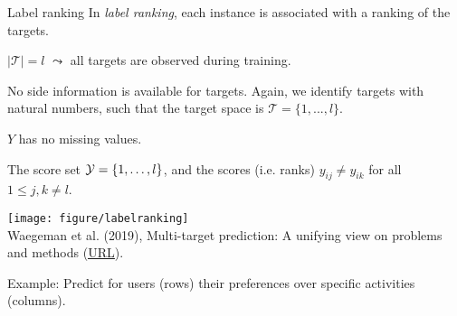\documentclass[11pt,compress,t,notes=noshow, xcolor=table]{beamer}
\newcommand{\Tspace}{\mathcal{T}}
\begin{document}
\begin{frame}{Label ranking}
	\small
    In \emph{label ranking}, each instance is associated with a ranking of the targets. 

		\begin{enumerate}\small
			
			\begin{minipage}{0.45\textwidth}    
                \item $|\Tspace| = l$ $\leadsto$ all targets are observed during training. 
                \vspace{10pt}

    			\item No side information is available for targets. Again, we identify targets with natural numbers, such that the target space is $\Tspace = \{1,...,l\}$. 		
                \vspace{10pt}
                
    			\item $Y$ has no missing values. 
                \vspace{10pt}
                
    			\item The score set $\mathcal{Y} = \{1, \ldots , l\}$, and the scores (i.e. ranks) $y_{ij} \neq y_{ik}$ for all $1 \leq j,k \neq l$. 
                \vspace{10pt}
			\end{minipage}
            \hfill
			\begin{minipage}{0.45\textwidth}    
			\begin{center}
                \texttt{[image: figure/labelranking]} \tiny
				\\ Waegeman et al. (2019), Multi-target prediction:
				A unifying view on problems and methods (\href{https://arxiv.org/pdf/1809.02352.pdf}{\underline{URL}}).
 	
			\end{center}
		\end{minipage}
		\end{enumerate}
  
    \vspace{10pt}
	Example: Predict for users (rows) their preferences over specific activities (columns).
	
\end{frame}
\end{document}

